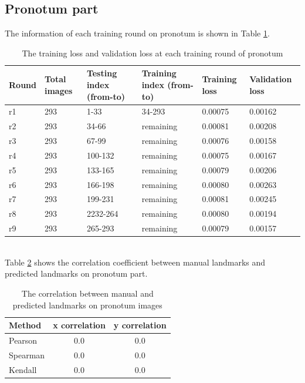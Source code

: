 \documentclass[12pt,a4paper]{article}
\begin{document}
\subsection{Pronotum part}
The information of each training round on pronotum is shown in Table \ref{pronoloss}.
\begin{table}[h!]
	\centering
	\begin{tabular}{l p{2cm} p{2.4cm} p{2.6cm} p{2.2cm} p{2.2cm}}
	Round & Total images & Testing index (from-to) & Training index (from-to) & Training loss & Validation loss \\ \hline
	r1 & 293 & 1-33 & 34-293 & 0.00075 & 0.00162 \\ \hline
	r2 & 293 & 34-66 & remaining & 0.00081 & 0.00208 \\ \hline
	r3 & 293 & 67-99 & remaining & 0.00076 & 0.00158 \\ \hline
	r4 & 293 & 100-132 & remaining & 0.00075 & 0.00167 \\ \hline
	r5 & 293 & 133-165 & remaining & 0.00079 & 0.00206 \\ \hline
	r6 & 293 & 166-198 & remaining & 0.00080 & 0.00263 \\ \hline
	r7 & 293 & 199-231 & remaining & 0.00081 & 0.00245 \\ \hline
	r8 & 293 & 2232-264 & remaining & 0.00080 & 0.00194 \\ \hline
	r9 & 293 & 265-293 & remaining & 0.00079 & 0.00157 \\ \hline	
	\end{tabular}
	\caption{The training loss and validation loss at each training round of pronotum}
	\label{pronoloss}
\end{table}~\\
Table \ref{corrprono} shows the correlation coefficient between manual landmarks and predicted landmarks on pronotum part.
\begin{table}[h!]
	\centering
	\begin{tabular}{l c c}
		Method & x correlation & y correlation \\ \hline
		Pearson & $0.0$ & $0.0$ \\ \hline
		Spearman & $0.0$ & $0.0$ \\ \hline
		Kendall & $0.0$ & $0.0$ \\ \hline
	\end{tabular}
	\caption{The correlation between manual and predicted landmarks on pronotum images}
	\label{corrprono}
\end{table}
\end{document}
